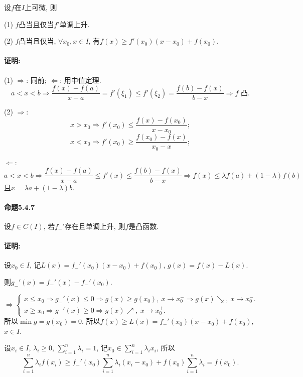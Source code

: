 设$f$在$I$上可微, 则

(1) $f$凸当且仅当$f'$单调上升.

(2) $f$凸当且仅当, $\forall x_{0},x\in I$, 有$f(x)\ge f'(x_{0})(x-x_{0})+f(x_{0})$. 

\paragraph{证明:}

(1) $\Longrightarrow$: 同前; $\Longleftarrow$: 用中值定理.
\[
a<x<b\Longrightarrow\frac{f(x)-f(a)}{x-a}=f'(\xi_{1})\le f'(\xi_{2})=\frac{f(b)-f(x)}{b-x}\Longrightarrow f\text{ 凸.}
\]

(2) $\Longrightarrow$: 
\[
x>x_{0}\Longrightarrow f'(x_{0})\le\frac{f(x)-f(x_{0})}{x-x_{0}};
\]
\[
x<x_{0}\Longrightarrow f'(x_{0})\ge\frac{f(x_{0})-f(x)}{x_{0}-x};
\]

$\Longleftarrow$: 
\[
a<x<b\Longrightarrow\frac{f(x)-f(a)}{x-a}\le f'(x)\le\frac{f(b)-f(x)}{b-x}\Longrightarrow f(x)\le\lambda f(a)+(1-\lambda)f(b)
\]
且$x=\lambda a+(1-\lambda)b$.

\paragraph{命题5.4.7}

设$f\in C(I)$, 若$f_{-}'$存在且单调上升, 则$f$是凸函数.

\paragraph{证明:}

设$x_{0}\in I$, 记$L(x)=f_{-}'(x_{0})(x-x_{0})+f(x_{0})$, $g(x)=f(x)-L(x)$.

则$g_{-}'(x)=f_{-}'(x)-f_{-}'(x_{0})$.

\[
\Longrightarrow\begin{cases}
	x\le x_{0}\Longrightarrow g_{-}'(x)\le0\Longrightarrow g(x)\ge g(x_{0}),\ x\to x_{0}^{-}\Longrightarrow g(x)\searrow,\ x\to x_{0}^{-}.\\
	x\ge x_{0}\Longrightarrow g_{-}'(x)\ge0\Longrightarrow g(x)\nearrow,\ x\to x_{0}^{+}.
\end{cases}
\]
所以$\min g=g(x_{0})=0$. 所以$f(x)\ge L(x)=f_{-}'(x_{0})(x-x_{0})+f(x_{0})$,
$x\in I$.

设$x_{i}\in I$, $\lambda_{i}\ge0$, $\sum_{i=1}^{n}\lambda_{i}=1$,
记$x_{0}\in\sum_{i=1}^{n}\lambda_{i}x_{i}$, 所以
\[
\sum_{i=1}^{n}\lambda_{i}f(x_{i})\ge f_{-}'(x_{0})\sum_{i=1}^{n}\lambda_{i}(x_{i}-x_{0})+f(x_{0})\sum_{i=1}^{n}\lambda_{i}=f(x_{0}).
\]


